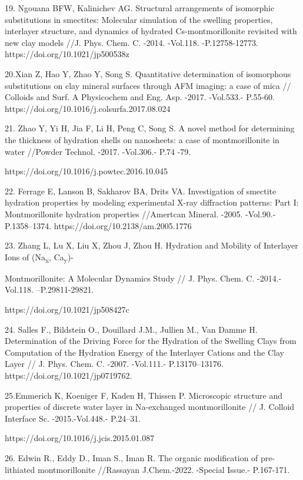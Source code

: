 \begin{noparindent}
19. Ngouana BFW, Kalinichev AG. Structural arrangements of isomorphic
substitutions in smectites: Molecular simulation of the swelling
properties, interlayer structure, and dynamics of hydrated
Cs-montmorillonite revisited with new clay models //J. Phys. Chem. C.
-2014. -Vol.118. -P.12758-12773. https://doi.org/10.1021/jp500538z

20.Xian Z, Hao Y, Zhao Y, Song S. Quantitative determination of
isomorphous substitutions on clay mineral surfaces through AFM imaging:
a case of mica // Colloids and Surf. A Physicochem and Eng. Asp. -2017.
-Vol.533.- P.55-60. https://doi.org/10.1016/j.colsurfa.2017.08.024

21. Zhao Y, Yi H, Jia F, Li H, Peng C, Song S. A novel method for
determining the thickness of hydration shells on nanosheets: a case of
montmorillonite in water //Powder Technol. -2017. -Vol.306.- P.74 -79.

https://doi.org/10.1016/j.powtec.2016.10.045

22. Ferrage E, Lanson B, Sakharov BA, Drits VA. Investigation of
smectite hydration properties by modeling experimental X-ray diffraction
patterns: Part I: Montmorillonite hydration properties //Amertcan
Mineral. -2005. -Vol.90.- P.1358--1374.
https://doi.org/10.2138/am.2005.1776

23. Zhang L, Lu X, Liu X, Zhou J, Zhou H. Hydration and Mobility of
Interlayer Ions of (Na\textsubscript{x},
Ca\textsubscript{y})-

Montmorillonite: A Molecular Dynamics Study // J.
Phys. Chem. C. -2014.-Vol.118. --P.29811-29821.

https://doi.org/10.1021/jp508427c

24. Salles F., Bildstein O., Douillard J.M., Jullien M., Van Damme H.
Determination of the Driving Force for the Hydration of the Swelling
Clays from Computation of the Hydration Energy of the Interlayer Cations
and the Clay Layer // J. Phys. Chem. C. -2007. -Vol.111.-
P.13170--13176. https://doi.org/10.1021/jp0719762.

25.Emmerich K, Koeniger F, Kaden H, Thissen P. Microscopic structure and
properties of discrete water layer in Na-exchanged montmorillonite // J.
Colloid Interface Sc. -2015.-Vol.448.- P.24--31.

https://doi.org/10.1016/j.jcis.2015.01.087

26. Edwin R., Eddy D., Iman S., Iman R. The organic modification of
pre-lithiated montmorillonite //Rassayan J.Chem.-2022. -Special Issue.-
P.167-171.


\end{noparindent}
